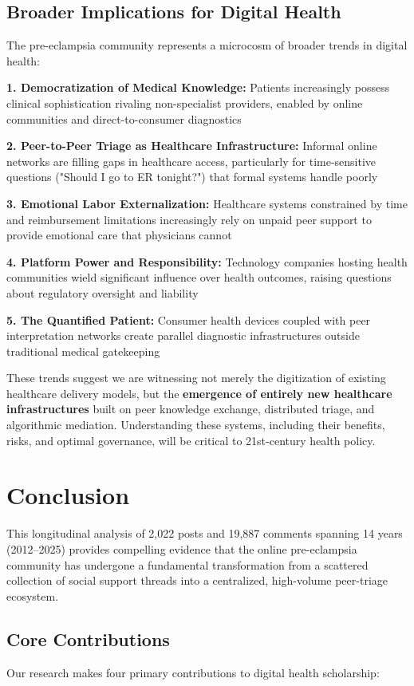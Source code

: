 \documentclass[12pt, a4paper]{article}
\begin{document}
\subsection{Broader Implications for Digital Health}
The pre-eclampsia community represents a microcosm of broader trends in digital health:

\textbf{1. Democratization of Medical Knowledge:} Patients increasingly possess clinical sophistication rivaling non-specialist providers, enabled by online communities and direct-to-consumer diagnostics

\textbf{2. Peer-to-Peer Triage as Healthcare Infrastructure:} Informal online networks are filling gaps in healthcare access, particularly for time-sensitive questions ("Should I go to ER tonight?") that formal systems handle poorly

\textbf{3. Emotional Labor Externalization:} Healthcare systems constrained by time and reimbursement limitations increasingly rely on unpaid peer support to provide emotional care that physicians cannot

\textbf{4. Platform Power and Responsibility:} Technology companies hosting health communities wield significant influence over health outcomes, raising questions about regulatory oversight and liability

\textbf{5. The Quantified Patient:} Consumer health devices coupled with peer interpretation networks create parallel diagnostic infrastructures outside traditional medical gatekeeping

These trends suggest we are witnessing not merely the digitization of existing healthcare delivery models, but the \textbf{emergence of entirely new healthcare infrastructures} built on peer knowledge exchange, distributed triage, and algorithmic mediation. Understanding these systems, including their benefits, risks, and optimal governance, will be critical to 21st-century health policy.

\section{Conclusion}

This longitudinal analysis of 2,022 posts and 19,887 comments spanning 14 years (2012--2025) provides compelling evidence that the online pre-eclampsia community has undergone a fundamental transformation from a scattered collection of social support threads into a centralized, high-volume peer-triage ecosystem.

\subsection{Core Contributions}
Our research makes four primary contributions to digital health scholarship:
\end{document}
